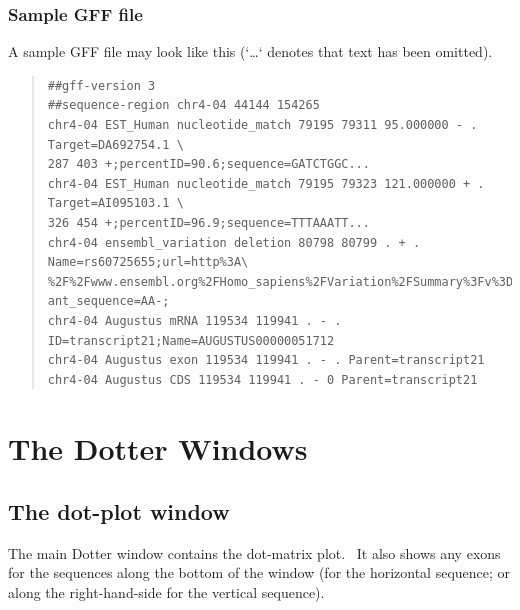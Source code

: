\documentclass[letterpaper]{article}
\begin{document}
\bigskip
{\color[rgb]{0.30980393,0.5058824,0.7411765}\subsubsection{Sample GFF file}}
{A sample GFF file may look like this ({\textquoteleft}{\dots}{\textquoteleft} denotes that text has been
omitted).}

\bigskip

\begin{quote}
\begin{verbatim}
##gff-version 3
##sequence-region chr4-04 44144 154265
chr4-04 EST_Human nucleotide_match 79195 79311 95.000000 - . Target=DA692754.1 \
287 403 +;percentID=90.6;sequence=GATCTGGC...
chr4-04 EST_Human nucleotide_match 79195 79323 121.000000 + . Target=AI095103.1 \
326 454 +;percentID=96.9;sequence=TTTAAATT...
chr4-04 ensembl_variation deletion 80798 80799 . + . Name=rs60725655;url=http%3A\
%2F%2Fwww.ensembl.org%2FHomo_sapiens%2FVariation%2FSummary%3Fv%3Drs60725655;vari\
ant_sequence=AA-;
chr4-04 Augustus mRNA 119534 119941 . - . ID=transcript21;Name=AUGUSTUS00000051712
chr4-04 Augustus exon 119534 119941 . - . Parent=transcript21
chr4-04 Augustus CDS 119534 119941 . - 0 Parent=transcript21
\end{verbatim}
\end{quote}

{\color[rgb]{0.0,0.27058825,0.5254902}\section[The Dotter Windows]{The Dotter Windows}}
{\color[rgb]{0.30980393,0.5058824,0.7411765}\subsection[The dot{}-plot window]{The dot-plot window}}
{The main Dotter window contains the dot-matrix plot. \ It also shows any
exons for the sequences along the bottom of the window (for the
horizontal sequence; or along the right-hand-side for the vertical
sequence).}
\end{document}
